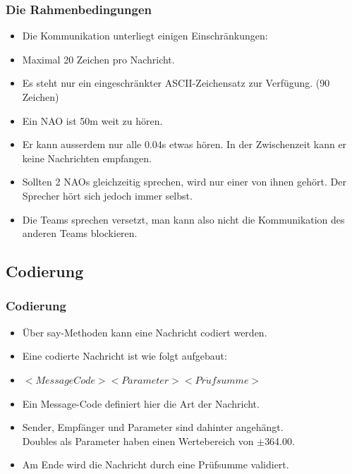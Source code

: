 \frame
{
  \frametitle{Die Rahmenbedingungen}
  \begin{itemize}
    \item Die Kommunikation unterliegt einigen Einschr\"ankungen: \vskip0.3cm
    \item Maximal 20 Zeichen pro Nachricht.
    \item Es steht nur ein eingeschr\"ankter ASCII-Zeichensatz zur Verf\"ugung. (90 Zeichen)
    \item Ein NAO ist 50m weit zu h\"oren.
    \item Er kann ausserdem nur alle 0.04s etwas h\"oren. In der Zwischenzeit kann er keine Nachrichten empfangen.
    \item Sollten 2 NAOs gleichzeitig sprechen, wird nur einer von ihnen geh\"ort. Der Sprecher h\"ort sich jedoch immer selbst.
    \item Die Teams sprechen versetzt, man kann also nicht die Kommunikation des anderen Teams blockieren.
  \end{itemize}
}

\subsection{Codierung}
\frame
{
  \frametitle{Codierung}
  
  \begin{itemize}
    \item \"Uber say-Methoden kann eine Nachricht codiert werden.
    \item Eine codierte Nachricht ist wie folgt aufgebaut: \vskip0.5cm
    \item $<MessageCode><Parameter><Pr\ddot{u}fsumme>$ \vskip0.5cm
    \item Ein Message-Code definiert hier die Art der Nachricht.
    \item Sender, Empf\"anger und Parameter sind dahinter angeh\"angt. \\Doubles als Parameter haben einen Wertebereich von $\pm$364.00.
    \item Am Ende wird die Nachricht durch eine Pr\"ufsumme validiert.
  \end{itemize}
}


